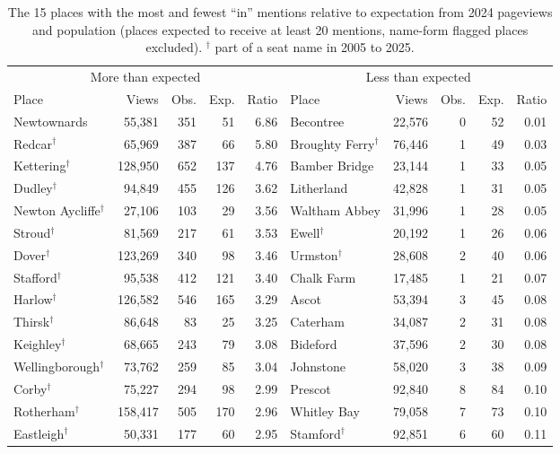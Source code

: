 \documentclass[11pt,a4paper]{article}
\begin{document}
\begin{table}[tbp]\centering\footnotesize\caption{The 15 places with the most and fewest ``in'' mentions relative to expectation from 2024 pageviews and population (places expected to receive at least 20 mentions, name-form flagged places excluded). $^\dagger$ part of a seat name in 2005 to 2025.}\label{tab:rank}\setlength{\tabcolsep}{3.5pt}\begin{tabular}{lrrrr@{\hskip 14pt}lrrrr}\toprule \multicolumn{5}{c}{More than expected} & \multicolumn{5}{c}{Less than expected}\\\cmidrule(r){1-5}\cmidrule(l){6-10}Place & Views & Obs. & Exp. & Ratio & Place & Views & Obs. & Exp. & Ratio\\\midrule
Newtownards & 55,381 & 351 & 51 & 6.86 & Becontree & 22,576 & 0 & 52 & 0.01\\
Redcar$^\dagger$ & 65,969 & 387 & 66 & 5.80 & Broughty Ferry$^\dagger$ & 76,446 & 1 & 49 & 0.03\\
Kettering$^\dagger$ & 128,950 & 652 & 137 & 4.76 & Bamber Bridge & 23,144 & 1 & 33 & 0.05\\
Dudley$^\dagger$ & 94,849 & 455 & 126 & 3.62 & Litherland & 42,828 & 1 & 31 & 0.05\\
Newton Aycliffe$^\dagger$ & 27,106 & 103 & 29 & 3.56 & Waltham Abbey & 31,996 & 1 & 28 & 0.05\\
Stroud$^\dagger$ & 81,569 & 217 & 61 & 3.53 & Ewell$^\dagger$ & 20,192 & 1 & 26 & 0.06\\
Dover$^\dagger$ & 123,269 & 340 & 98 & 3.46 & Urmston$^\dagger$ & 28,608 & 2 & 40 & 0.06\\
Stafford$^\dagger$ & 95,538 & 412 & 121 & 3.40 & Chalk Farm & 17,485 & 1 & 21 & 0.07\\
Harlow$^\dagger$ & 126,582 & 546 & 165 & 3.29 & Ascot & 53,394 & 3 & 45 & 0.08\\
Thirsk$^\dagger$ & 86,648 & 83 & 25 & 3.25 & Caterham & 34,087 & 2 & 31 & 0.08\\
Keighley$^\dagger$ & 68,665 & 243 & 79 & 3.08 & Bideford & 37,596 & 2 & 30 & 0.08\\
Wellingborough$^\dagger$ & 73,762 & 259 & 85 & 3.04 & Johnstone & 58,020 & 3 & 38 & 0.09\\
Corby$^\dagger$ & 75,227 & 294 & 98 & 2.99 & Prescot & 92,840 & 8 & 84 & 0.10\\
Rotherham$^\dagger$ & 158,417 & 505 & 170 & 2.96 & Whitley Bay & 79,058 & 7 & 73 & 0.10\\
Eastleigh$^\dagger$ & 50,331 & 177 & 60 & 2.95 & Stamford$^\dagger$ & 92,851 & 6 & 60 & 0.11\\
\bottomrule\end{tabular}\end{table}
\end{document}
